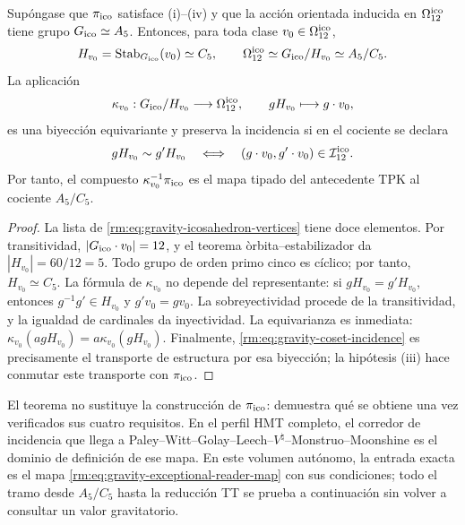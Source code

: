 \begin{theorem}
\label{rm:thm:gravity-exceptional-descent}
Sup\'ongase que \(\pi_{\rm ico}\) satisface (i)--(iv) y que la acci\'on
orientada inducida en \(\Omega_{12}^{\rm ico}\) tiene grupo
\(G_{\rm ico}\simeq A_5\). Entonces, para toda clase
\(v_0\in\Omega_{12}^{\rm ico}\),
\begin{equation}
\label{rm:eq:gravity-icosahedral-quotient}
H_{v_0}=\operatorname{Stab}_{G_{\rm ico}}(v_0)\simeq C_5,
\qquad
\Omega_{12}^{\rm ico}\simeq G_{\rm ico}/H_{v_0}\simeq A_5/C_5.
\end{equation}
La aplicaci\'on
\begin{equation}
\label{rm:eq:gravity-coset-map}
\kappa_{v_0}:G_{\rm ico}/H_{v_0}\longrightarrow\Omega_{12}^{\rm ico},
\qquad gH_{v_0}\longmapsto g\cdot v_0,
\end{equation}
es una biyecci\'on equivariante y preserva la incidencia si en el cociente
se declara
\begin{equation}
\label{rm:eq:gravity-coset-incidence}
gH_{v_0}\sim g'H_{v_0}
\quad\Longleftrightarrow\quad
(g\cdot v_0,g'\cdot v_0)\in\mathcal I_{12}^{\rm ico}.
\end{equation}
Por tanto, el compuesto \(\kappa_{v_0}^{-1}\pi_{\rm ico}\) es el mapa
tipado del antecedente TPK al cociente \(A_5/C_5\).
\end{theorem}

\begin{proof}
La lista de \cref{rm:eq:gravity-icosahedron-vertices} tiene doce elementos.
Por transitividad, \(|G_{\rm ico}\cdot v_0|=12\), y el teorema
\`orbita--estabilizador da \(|H_{v_0}|=60/12=5\). Todo grupo de orden
primo cinco es c\'iclico; por tanto, \(H_{v_0}\simeq C_5\). La f\'ormula de
\(\kappa_{v_0}\) no depende del representante: si
\(gH_{v_0}=g'H_{v_0}\), entonces \(g^{-1}g'\in H_{v_0}\) y
\(g'v_0=gv_0\). La sobreyectividad procede de la transitividad, y la
igualdad de cardinales da inyectividad. La equivarianza es inmediata:
\(\kappa_{v_0}(agH_{v_0})=a\kappa_{v_0}(gH_{v_0})\). Finalmente,
\cref{rm:eq:gravity-coset-incidence} es precisamente el transporte de
estructura por esa biyecci\'on; la hip\'otesis (iii) hace conmutar este
transporte con \(\pi_{\rm ico}\).
\end{proof}

El teorema no sustituye la construcci\'on de \(\pi_{\rm ico}\): demuestra
qu\'e se obtiene una vez verificados sus cuatro requisitos. En el perfil
HMT completo, el corredor de incidencia que llega a
Paley--Witt--Golay--Leech--\(V^\natural\)--Monstruo--Moonshine es el
dominio de definici\'on de ese mapa. En este volumen aut\'onomo, la entrada exacta es
el mapa \cref{rm:eq:gravity-exceptional-reader-map} con sus condiciones; todo
el tramo desde \(A_5/C_5\) hasta la reducci\'on TT se prueba a continuaci\'on
sin volver a consultar un valor gravitatorio.

